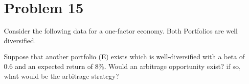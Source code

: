 \documentclass[12]{article}
\begin{document}
\section*{Problem 15}
Consider the following data for a one-factor economy. Both Portfolios are well diversified. 
\begin{table}[H]
\centering
{}
\end{table}
\noindent
Suppose that another portfolio (E) exists which is well-diversified with a beta of 0.6 and an expected return of 8\%. Would an arbitrage opportunity exist? if so, what would be the arbitrage strategy?
\end{document}
